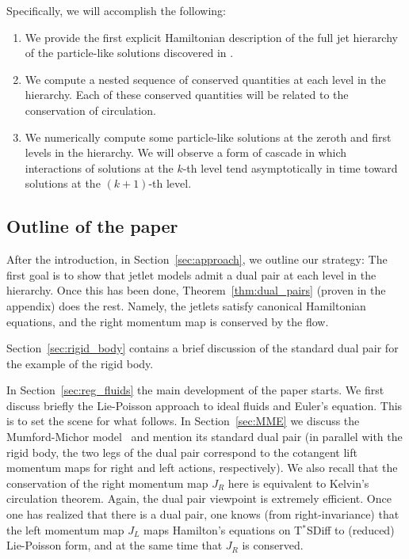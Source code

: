 \documentclass[12pt]{amsart}
\begin{document}
 Specifically, we will accomplish the following:
\begin{enumerate}
  \item We provide the first explicit Hamiltonian description of the full jet hierarchy of the particle-like solutions discovered in 
  	\cite{JacobsRatiuDesbrun2013,CotterHolmJacobsMeier2014}.
  \item We compute a nested sequence of conserved quantities at 
    each level in the hierarchy.
    Each of these conserved quantities will be related to the conservation
    of circulation.
  \item We numerically compute some particle-like solutions at the zeroth and first levels in the hierarchy.  We will observe a form of cascade in which interactions of solutions at the $k$-th level tend asymptotically in time toward solutions at the $(k+1)$-th level.
\end{enumerate}

\subsection{Outline of the paper}
After the introduction, in Section~\ref{sec:approach}, we outline our strategy: The first goal is to show that jetlet models admit a dual pair at each level in the hierarchy. Once this has been done, Theorem~\ref{thm:dual_pairs} (proven in the appendix) does the rest. Namely, the jetlets satisfy canonical Hamiltonian equations, and the right momentum map is conserved by the flow.

Section~\ref{sec:rigid_body} contains a brief discussion of the standard dual pair for the example of the  rigid body.

In Section~\ref{sec:reg_fluids} the main development of the paper starts. We first discuss briefly the Lie-Poisson approach to ideal fluids and Euler's equation. This is to set the scene for what follows. In Section~\ref{sec:MME} we discuss the Mumford-Michor model~\cite{MumfordMichor2013} and mention its standard dual pair (in parallel with the rigid body, the two legs of the dual pair correspond to the cotangent lift momentum maps for right and left actions, respectively).
We also recall that the conservation of the right momentum map $J_R$ here is equivalent to Kelvin's circulation theorem. Again, the dual pair viewpoint is extremely efficient. Once one has realized that there is a dual pair, one knows (from right-invariance) that the left momentum map $J_L$ maps Hamilton's equations on T$^*$SDiff to (reduced) Lie-Poisson form, and at the same time that $J_R$ is conserved.
\end{document}
